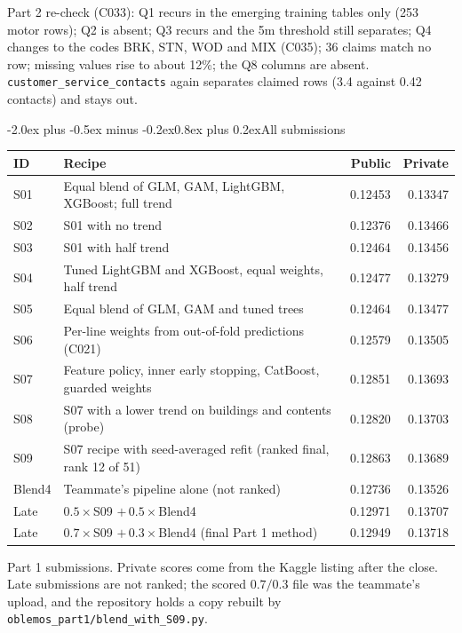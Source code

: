 \documentclass[11pt,a4paper]{article}
\makeatletter
\renewcommand\section{\@startsection{section}{1}{\z@}%
  {-2.0ex plus -0.5ex minus -0.2ex}{0.8ex plus 0.2ex}{\normalfont\large\bfseries}}
\newenvironment{fixedtable}%
  {\par\medskip\noindent\begin{minipage}{\linewidth}\def\@captype{table}\centering}%
  {\end{minipage}\par\medskip}
\newcommand{\code}[1]{\texttt{#1}}
\makeatother
\begin{document}
Part 2 re-check (C033): Q1 recurs in the emerging training tables only (253 motor rows); Q2 is absent; Q3 recurs and
the 5m threshold still separates; Q4 changes to the codes BRK, STN, WOD and MIX (C035); 36 claims match no row; missing
values rise to about 12\%; the Q8 columns are absent. \code{customer\_service\_contacts} again separates claimed rows (3.4
against 0.42 contacts) and stays out.

\section{All submissions}

\begin{fixedtable}
\centering\small
\begin{tabularx}{\textwidth}{lXrr}
\toprule
ID & Recipe & Public & Private\\
\midrule
S01 & Equal blend of GLM, GAM, LightGBM, XGBoost; full trend & 0.12453 & 0.13347\\
S02 & S01 with no trend & 0.12376 & 0.13466\\
S03 & S01 with half trend & 0.12464 & 0.13456\\
S04 & Tuned LightGBM and XGBoost, equal weights, half trend & 0.12477 & 0.13279\\
S05 & Equal blend of GLM, GAM and tuned trees & 0.12464 & 0.13477\\
S06 & Per-line weights from out-of-fold predictions (C021) & 0.12579 & 0.13505\\
S07 & Feature policy, inner early stopping, CatBoost, guarded weights & 0.12851 & 0.13693\\
S08 & S07 with a lower trend on buildings and contents (probe) & 0.12820 & 0.13703\\
S09 & S07 recipe with seed-averaged refit (ranked final, rank 12 of 51) & 0.12863 & 0.13689\\
Blend4 & Teammate's pipeline alone (not ranked) & 0.12736 & 0.13526\\
Late & $0.5\times$S09 $+\,0.5\times$Blend4 & 0.12971 & 0.13707\\
Late & $0.7\times$S09 $+\,0.3\times$Blend4 (final Part 1 method) & 0.12949 & 0.13718\\
\bottomrule
\end{tabularx}
\caption{Part 1 submissions. Private scores come from the Kaggle listing after the close. Late submissions are not
ranked; the scored $0.7/0.3$ file was the teammate's upload, and the repository holds a copy rebuilt by
\code{oblemos\_part1/blend\_with\_S09.py}.}
\end{fixedtable}
\end{document}
